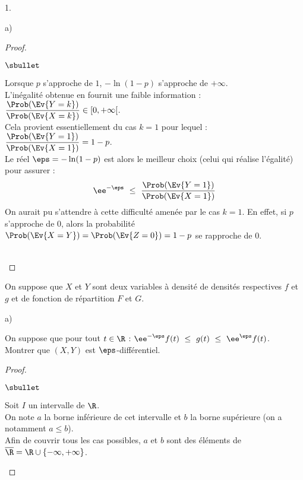 \documentclass[11pt]{article}%
\begin{document}
\begin{noliste}{1.}
\begin{noliste}{a)}
\begin{proof}
\begin{noliste}{$\sbullet$}
      \item Lorsque $p$ s'approche de $1$, $-\ln(1-p)$ s'approche de
        $+\infty$.\\
        L'inégalité obtenue en  fournit une faible
        information : $\dfrac{\Prob(\Ev{Y= k})}{\Prob(\Ev{X = k})}
        \in [0, +\infty[$.\\[.2cm]
        Cela provient essentiellement du cas $k = 1$ pour lequel :
        $\dfrac{\Prob(\Ev{Y= 1})}{\Prob(\Ev{X = 1})} = 1 - p$.\\
        Le réel $\eps = -\ln(1-p)$ est alors le meilleur choix (celui
        qui réalise l'égalité) pour assurer :
        \[
        \ee^{-\eps} \ \leq \ \dfrac{\Prob(\Ev{Y= 1})}{\Prob(\Ev{X =
            1})}
        \]
        On aurait pu s'attendre à cette difficulté amenée par le cas
        $k = 1$. En effet, si $p$ s'approche de $0$, alors la
        probabilité $\Prob(\Ev{X = Y}) = \Prob(\Ev{Z = 0}) = 1-p$ se
        rapproche de $0$.
      \end{noliste}~\\[-1cm]
    \end{proof}
  \end{noliste}
  
\item On suppose que $X$ et $Y$ sont deux variables à densité de
  densités respectives $f$ et $g$ et de fonction de répartition $F$ et
  $G$.
  \begin{noliste}{a)}
    \setlength{\itemsep}{2mm} %
  \item On suppose que pour tout $t\in\R$ : $\ee^{-\eps} f(t) \ \leq \
    g(t) \ \leq \ \ee^{\eps}f(t)$.\\
    Montrer que $(X,Y)$ est $\eps$-différentiel.

    \begin{proof}~%
      \begin{noliste}{$\sbullet$}
      \item Soit $I$ un intervalle de $\R$.\\
        On note $a$ la borne inférieure de cet intervalle et $b$ la
        borne supérieure (on a notamment $a \leq b$).\\
        Afin de couvrir tous les cas possibles, $a$ et $b$ sont des
        éléments de $\overline{\R} = \R \cup \{-\infty, +\infty\}$.
        
        
        
        \newpage
        


\end{noliste}
\end{proof}
\end{noliste}
\end{noliste}
\end{document}
